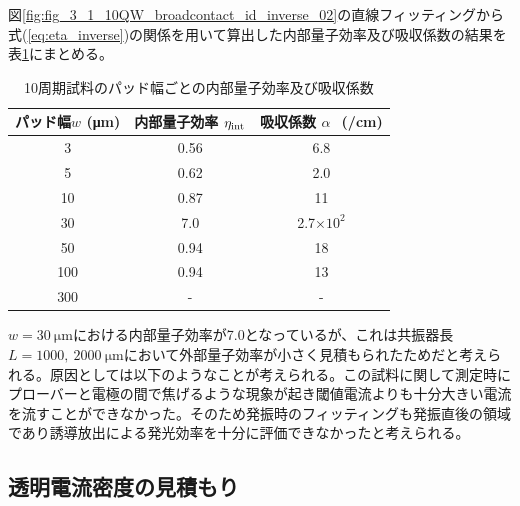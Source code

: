 {{\newpage
図\ref{fig:fig_3_1_10QW_broadcontact_id_inverse_02}の直線フィッティングから式(\ref{eq:eta_inverse})の関係を用いて算出した内部量子効率及び吸収係数の結果を表\ref{table:table_10QW_i_int}にまとめる。
\begin{table}[h]
  \caption{10周期試料のパッド幅ごとの内部量子効率及び吸収係数}
  \label{table:table_10QW_i_int}
  \centering
  \begin{tabular}{ccc}
    \hline
    パッド幅$w$ (\si{\micro\metre})  &  内部量子効率 $\eta_{\rm{int}} $ &吸収係数 $\alpha\ $\ (/\si{cm}) \\
    \hline \hline
     3 & 0.56 & 6.8 \\
    5  & 0.62 & 2.0\\
    10  & 0.87 & 11\\ 
    30& 7.0& 2.7$\times 10^2$\\
    50& 0.94&18 \\
    100& 0.94& 13\\
    300&- & -\\
    \hline
  \end{tabular}
\end{table}
$w=30\ \si{\micro\metre}$における内部量子効率が7.0となっているが、これは共振器長$L=1000,\  2000\ \si{\micro\metre}$において外部量子効率が小さく見積もられたためだと考えられる。原因としては以下のようなことが考えられる。この試料に関して測定時にプローバーと電極の間で焦げるような現象が起き閾値電流よりも十分大きい電流を流すことができなかった。そのため発振時のフィッティングも発振直後の領域であり誘導放出による発光効率を十分に評価できなかったと考えられる。

\clearpage
\subsection{透明電流密度の見積もり}

}}
